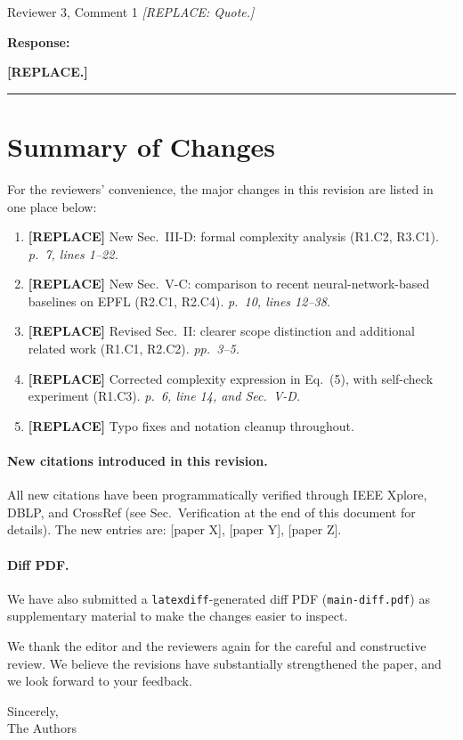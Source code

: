 \documentclass[11pt,letterpaper]{article}
\newcommand{\response}{\par\textbf{\color{responseaccent}Response:}\par}
\begin{document}
\begin{reviewercomment}{Reviewer 3, Comment 1}
\textit{[REPLACE: Quote.]}
\end{reviewercomment}

\response \textbf{[REPLACE.]}

\hrule

\section*{Summary of Changes}

For the reviewers' convenience, the major changes in this revision are
listed in one place below:

\begin{enumerate}[label=\textbf{Change \arabic*.}, leftmargin=*, itemsep=4pt]
    \item \textbf{[REPLACE]} New Sec.~III-D: formal complexity analysis
          (R1.C2, R3.C1). \emph{p.~7, lines 1--22.}
    \item \textbf{[REPLACE]} New Sec.~V-C: comparison to recent
          neural-network-based baselines on EPFL (R2.C1, R2.C4).
          \emph{p.~10, lines 12--38.}
    \item \textbf{[REPLACE]} Revised Sec.~II: clearer scope distinction
          and additional related work (R1.C1, R2.C2). \emph{pp.~3--5.}
    \item \textbf{[REPLACE]} Corrected complexity expression in
          Eq.~(5), with self-check experiment (R1.C3). \emph{p.~6,
          line 14, and Sec.~V-D.}
    \item \textbf{[REPLACE]} Typo fixes and notation cleanup throughout.
\end{enumerate}

\paragraph{New citations introduced in this revision.} All new citations
have been programmatically verified through IEEE Xplore, DBLP, and
CrossRef (see Sec.~Verification at the end of this document for
details). The new entries are: [paper X], [paper Y], [paper Z].

\paragraph{Diff PDF.} We have also submitted a \texttt{latexdiff}-generated
diff PDF (\texttt{main-diff.pdf}) as supplementary material to make the
changes easier to inspect.

\vspace{1em}

\noindent
We thank the editor and the reviewers again for the careful and
constructive review. We believe the revisions have substantially
strengthened the paper, and we look forward to your feedback.

\vspace{2em}

\noindent
Sincerely,\\
The Authors
\end{document}
